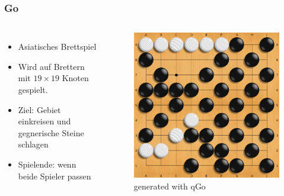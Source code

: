 \begin{frame}
    \frametitle{Go}
    \begin{columns}
        \begin{itemize}
            \item Asiatisches Brettspiel
            \item Wird auf Brettern mit $19 \times 19$ Knoten gespielt.
            \item Ziel: Gebiet einkreisen und gegnerische Steine schlagen
            \item Spielende: wenn beide Spieler passen
        \end{itemize}
        \begin{figure}
            \centering
            \includegraphics[scale=0.25]{content/img/go_board}
            \caption{generated with qGo}
        \end{figure}
    \end{columns}
\end{frame}

